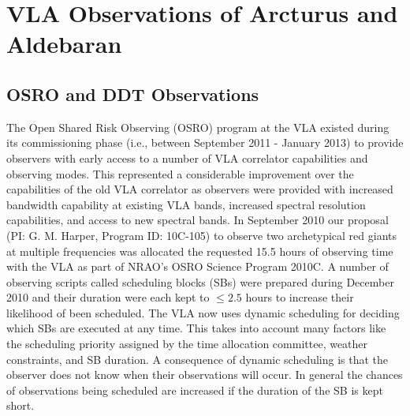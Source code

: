 \section{VLA Observations of Arcturus and Aldebaran}\label{sec:3.6}
\subsection{OSRO and DDT Observations}\label{sec:3.6.1}
The Open Shared Risk Observing (OSRO) program at the VLA existed during its commissioning phase (i.e., between  September 2011 - January 2013) to provide observers with early access to a number of VLA correlator capabilities and observing modes. This represented a considerable improvement over the capabilities of the old VLA correlator as observers were provided with increased bandwidth capability at existing VLA bands, increased spectral resolution capabilities, and access to new spectral bands. In September 2010 our proposal (PI: G. M. Harper, Program ID: 10C-105) to observe two archetypical red giants at multiple frequencies was allocated the requested 15.5 hours of observing time with the VLA as part of NRAO's OSRO Science Program 2010C. A number of observing scripts called scheduling blocks (SBs) were prepared during December 2010 and their duration were each kept to $\leq 2.5$ hours to increase their likelihood of been scheduled. The VLA now uses dynamic scheduling for deciding which SBs are executed at any time. This takes into account many factors like the scheduling priority assigned by the time allocation committee, weather constraints, and SB duration. A consequence of dynamic scheduling is that the observer does not know when their observations will occur. In general the chances of observations being scheduled are increased if the duration of the SB is kept short.

